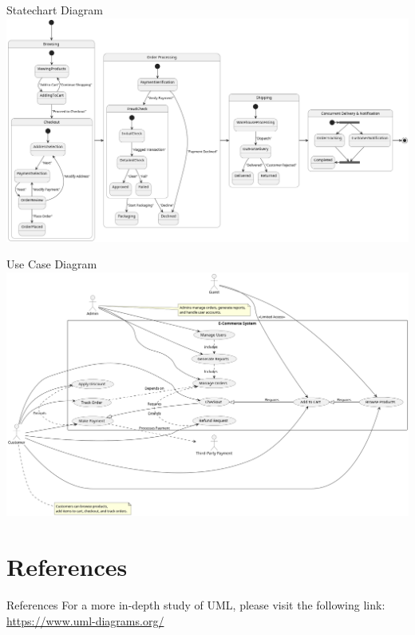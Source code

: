 \documentclass[aspectratio=169, table]{beamer}
\begin{document}
\begin{frame}{Statechart Diagram}
	\vspace{30pt}
	\centering
	\includegraphics[width=\textwidth,height=0.8\textheight,keepaspectratio]{../../figures/out/statechart_diagram.png}
\end{frame}

\begin{frame}{Use Case Diagram}
	\vspace{30pt}
	\centering
	\includegraphics[width=\textwidth,height=0.8\textheight,keepaspectratio]{../../figures/out/usecase_diagram.png}
\end{frame}

\section{References}

\begin{frame}{References}
	\vspace{20pt}
	For a more in-depth study of UML, please visit the following link:  
	\url{https://www.uml-diagrams.org/}
\end{frame}
\end{document}
